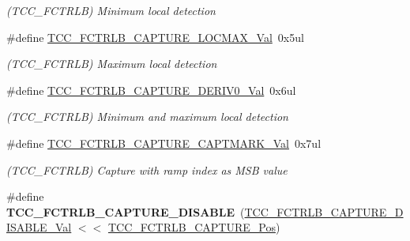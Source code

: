 \begin{DoxyCompactItemize}
\begin{DoxyCompactList}\small\item\em (T\+C\+C\+\_\+\+F\+C\+T\+R\+L\+B) Minimum local detection \end{DoxyCompactList}\item 
\hypertarget{group___s_a_m_l21___t_c_c_ga23f48658bf316c44b4a09628d76d16d2}{}\#define \hyperlink{group___s_a_m_l21___t_c_c_ga23f48658bf316c44b4a09628d76d16d2}{T\+C\+C\+\_\+\+F\+C\+T\+R\+L\+B\+\_\+\+C\+A\+P\+T\+U\+R\+E\+\_\+\+L\+O\+C\+M\+A\+X\+\_\+\+Val}~0x5ul\label{group___s_a_m_l21___t_c_c_ga23f48658bf316c44b4a09628d76d16d2}

\begin{DoxyCompactList}\small\item\em (T\+C\+C\+\_\+\+F\+C\+T\+R\+L\+B) Maximum local detection \end{DoxyCompactList}\item 
\hypertarget{group___s_a_m_l21___t_c_c_gad108279367c9aaaa43013809242961b8}{}\#define \hyperlink{group___s_a_m_l21___t_c_c_gad108279367c9aaaa43013809242961b8}{T\+C\+C\+\_\+\+F\+C\+T\+R\+L\+B\+\_\+\+C\+A\+P\+T\+U\+R\+E\+\_\+\+D\+E\+R\+I\+V0\+\_\+\+Val}~0x6ul\label{group___s_a_m_l21___t_c_c_gad108279367c9aaaa43013809242961b8}

\begin{DoxyCompactList}\small\item\em (T\+C\+C\+\_\+\+F\+C\+T\+R\+L\+B) Minimum and maximum local detection \end{DoxyCompactList}\item 
\hypertarget{group___s_a_m_l21___t_c_c_gacacf825e5ba84c658fd49b72ffc7aa00}{}\#define \hyperlink{group___s_a_m_l21___t_c_c_gacacf825e5ba84c658fd49b72ffc7aa00}{T\+C\+C\+\_\+\+F\+C\+T\+R\+L\+B\+\_\+\+C\+A\+P\+T\+U\+R\+E\+\_\+\+C\+A\+P\+T\+M\+A\+R\+K\+\_\+\+Val}~0x7ul\label{group___s_a_m_l21___t_c_c_gacacf825e5ba84c658fd49b72ffc7aa00}

\begin{DoxyCompactList}\small\item\em (T\+C\+C\+\_\+\+F\+C\+T\+R\+L\+B) Capture with ramp index as M\+S\+B value \end{DoxyCompactList}\item 
\hypertarget{group___s_a_m_l21___t_c_c_ga49f47c1e066ec4b6206203332eede180}{}\#define {\bfseries T\+C\+C\+\_\+\+F\+C\+T\+R\+L\+B\+\_\+\+C\+A\+P\+T\+U\+R\+E\+\_\+\+D\+I\+S\+A\+B\+L\+E}~(\hyperlink{group___s_a_m_l21___t_c_c_ga67d4df05f009429c2ddbffa7a609eb96}{T\+C\+C\+\_\+\+F\+C\+T\+R\+L\+B\+\_\+\+C\+A\+P\+T\+U\+R\+E\+\_\+\+D\+I\+S\+A\+B\+L\+E\+\_\+\+Val} $<$$<$ \hyperlink{group___s_a_m_l21___t_c_c_gaf72ca0ec9e27e86144624bfb8d4ac36b}{T\+C\+C\+\_\+\+F\+C\+T\+R\+L\+B\+\_\+\+C\+A\+P\+T\+U\+R\+E\+\_\+\+Pos})\label{group___s_a_m_l21___t_c_c_ga49f47c1e066ec4b6206203332eede180}


\end{DoxyCompactItemize}
